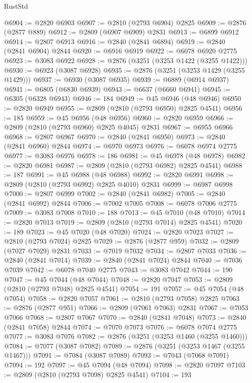 \begin{lexlean}{RustStd}
\begin{coremodule}
@6904 := @2820 @6903
@6907 := @2810 (@2793 @6904) @2825
@6909 := @2876 (@2877 @889)
@6912 := @2809 (@6907 @6909) @2831
@6913 := @6899 @6912
@6914 := @2807 @6913
@6916 := @2840 (@2841 @6894)
@6919 := @2840 (@2841 @6904) @2844
@6920 := @6916 @6919
@6922 := @6078 @6920 @2775
@6923 := @3083 @6922
@6928 := @2876 (@3251 (@3253 @1422 (@3255 @1422)))
@6930 := @6923 (@3087 @6928)
@6935 := @2876 (@3251 (@3253 @1429 (@3255 @1429)))
@6937 := @6930 (@3087 @6935)
@6939 := @6889 (@6914 @6937)
@6941 := @6805 (@6830 @6939)
@6943 := @6637 (@6660 @6941)
@6945 := @6305 (@6328 @6943)
@6946 := 184
@6949 := @45 @6946 (@48 @6946)
@6950 := @2820 @6949
@6955 := @2809 (@2810 (@2793 @6950) @2825 @4541)
@6956 := 185
@6959 := @45 @6956 (@48 @6956)
@6960 := @2820 @6959
@6966 := @2809 (@2810 (@2793 @6960) @2825 @4045) @2831
@6967 := @6955 @6966
@6968 := @2807 @6967
@6970 := @2840 (@2841 @6950)
@6973 := @2840 (@2841 @6960) @2844
@6974 := @6970 @6973
@6976 := @6078 @6974 @2775
@6977 := @3083 @6976
@6978 := 186
@6981 := @45 @6978 (@48 @6978)
@6982 := @2820 @6981
@6987 := @2809 (@2810 (@2793 @6982) @2825 @4541)
@6988 := 187
@6991 := @45 @6988 (@48 @6988)
@6992 := @2820 @6991
@6998 := @2809 (@2810 (@2793 @6992) @2825 @4010) @2831
@6999 := @6987 @6998
@7000 := @2807 @6999
@7002 := @2840 (@2841 @6982)
@7005 := @2840 (@2841 @6992) @2844
@7006 := @7002 @7005
@7008 := @6078 @7006 @2775
@7009 := @3083 @7008
@7010 := 188
@7013 := @45 @7010 (@48 @7010)
@7014 := @2820 @7013
@7019 := @2809 (@2810 (@2793 @7014) @2825 @4541)
@7020 := 189
@7023 := @45 @7020 (@48 @7020)
@7024 := @2820 @7023
@7027 := @2810 (@2793 @7024) @2825
@7029 := @2876 (@2877 @959)
@7032 := @2809 (@7027 @7029) @2831
@7033 := @7019 @7032
@7034 := @2807 @7033
@7036 := @2840 (@2841 @7014)
@7039 := @2840 (@2841 @7024) @2844
@7040 := @7036 @7039
@7042 := @6078 @7040 @2775
@7043 := @3083 @7042
@7044 := 190
@7047 := @45 @7044 (@48 @7044)
@7048 := @2820 @7047
@7053 := @2809 (@2810 (@2793 @7048) @2825 @4541)
@7054 := 191
@7057 := @45 @7054 (@48 @7054)
@7058 := @2820 @7057
@7061 := @2810 (@2793 @7058) @2825
@7063 := @2876 (@2877 @951)
@7066 := @2809 (@7061 @7063) @2831
@7067 := @7053 @7066
@7068 := @2807 @7067
@7070 := @2840 (@2841 @7048)
@7073 := @2840 (@2841 @7058) @2844
@7074 := @7070 @7073
@7076 := @6078 @7074 @2775
@7077 := @3083 @7076
@7082 := @2876 (@3251 (@3253 @1460 (@3255 @1460)))
@7084 := @7077 (@3087 @7082)
@7089 := @2876 (@3251 (@3253 @1467 (@3255 @1467)))
@7091 := @7084 (@3087 @7089)
@7093 := @7043 (@7068 @7091)
@7094 := 192
@7097 := @45 @7094 (@48 @7094)
@7098 := @2820 @7097
@7103 := @2809 (@2810 (@2793 @7098) @2825 @4541)
@7104 := 193

\end{coremodule}
\end{lexlean}
